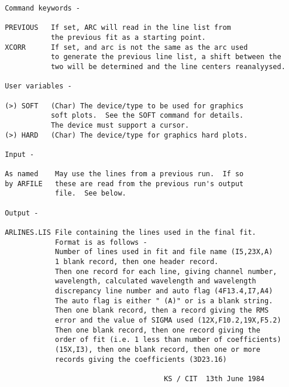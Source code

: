 \begin{description}
\begin{verbatim}
 Command keywords -

 PREVIOUS   If set, ARC will read in the line list from
            the previous fit as a starting point.
 XCORR      If set, and arc is not the same as the arc used
            to generate the previous line list, a shift between the
            two will be determined and the line centers reanalyysed.

 User variables -

 (>) SOFT   (Char) The device/type to be used for graphics
            soft plots.  See the SOFT command for details.
            The device must support a cursor.
 (>) HARD   (Char) The device/type for graphics hard plots.

 Input -

 As named    May use the lines from a previous run.  If so
 by ARFILE   these are read from the previous run's output
             file.  See below.

 Output -

 ARLINES.LIS File containing the lines used in the final fit.
             Format is as follows -
             Number of lines used in fit and file name (I5,23X,A)
             1 blank record, then one header record.
             Then one record for each line, giving channel number,
             wavelength, calculated wavelength and wavelength
             discrepancy line number and auto flag (4F13.4,I7,A4)
             The auto flag is either " (A)" or is a blank string.
             Then one blank record, then a record giving the RMS
             error and the value of SIGMA used (12X,F10.2,19X,F5.2)
             Then one blank record, then one record giving the
             order of fit (i.e. 1 less than number of coefficients)
             (15X,I3), then one blank record, then one or more
             records giving the coefficients (3D23.16)

                                       KS / CIT  13th June 1984
\end{verbatim}
\end{description}
